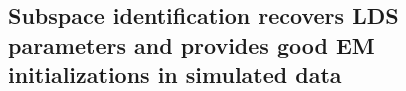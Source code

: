 \subsection{Subspace identification recovers LDS parameters and provides good EM initializations in simulated data}
\label{sec:slds:3.2.3}